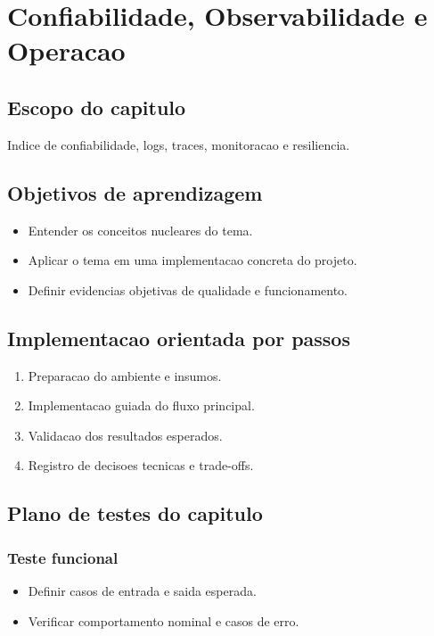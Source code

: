 \chapter{Confiabilidade, Observabilidade e Operacao}
\label{chap:confiabilidade_observabilidade}

\section{Escopo do capitulo}
Indice de confiabilidade, logs, traces, monitoracao e resiliencia.

\section{Objetivos de aprendizagem}
\begin{itemize}[leftmargin=*]
  \item Entender os conceitos nucleares do tema.
  \item Aplicar o tema em uma implementacao concreta do projeto.
  \item Definir evidencias objetivas de qualidade e funcionamento.
\end{itemize}

\section{Implementacao orientada por passos}
\begin{enumerate}[leftmargin=*]
  \item Preparacao do ambiente e insumos.
  \item Implementacao guiada do fluxo principal.
  \item Validacao dos resultados esperados.
  \item Registro de decisoes tecnicas e trade-offs.
\end{enumerate}

\section{Plano de testes do capitulo}
\subsection{Teste funcional}
\begin{itemize}[leftmargin=*]
  \item Definir casos de entrada e saida esperada.
  \item Verificar comportamento nominal e casos de erro.
\end{itemize}

